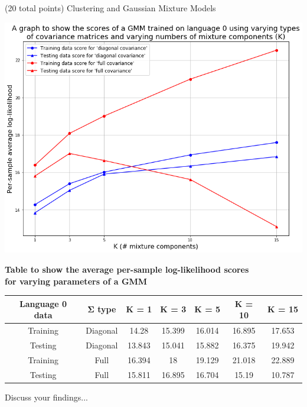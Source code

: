 \documentclass[12pt]{article}
\begin{document}
\begin{question}{(20 total points) Clustering and Gaussian Mixture Models}
\begin{subquestion}
      \begin{answerbox}{50em}
         \includegraphics[width=1\textwidth]{images/q35.png}
        \footnotesize{
        \begin{center}
        \textbf{Table to show the average per-sample log-likelihood scores} \\
        \textbf{for varying parameters of a GMM} \\
        \vspace{0.3cm}
        \begin{tabular}{ |c|c|c|c|c|c|c| } \hline
        \textbf{Language 0 data} & \textbf{$\mathbf{\Sigma}$ type} & \textbf{K = 1} & \textbf{K = 3} & \textbf{K = 5} & \textbf{K = 10} & \textbf{K = 15} \\ \hline
        Training & Diagonal & 14.28 & 15.399 & 16.014 & 16.895 & 17.653 \\
        Testing & Diagonal & 13.843 & 15.041 & 15.882 & 16.375 & 19.942 \\
        Training & Full & 16.394 & 18 & 19.129 & 21.018 & 22.889 \\
        Testing & Full & 15.811 & 16.895 & 16.704 & 15.19 & 10.787 \\ \hline
        \end{tabular}
        \end{center}
        Discuss your findings...
        }
      \end{answerbox}
  


   \end{subquestion}

   
\end{question}
\end{document}
